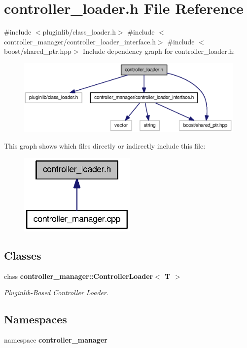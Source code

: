 \section{controller\-\_\-loader.\-h \-File \-Reference}
\label{controller__loader_8h}
{\ttfamily \#include $<$pluginlib/class\-\_\-loader.\-h$>$}\*
{\ttfamily \#include $<$controller\-\_\-manager/controller\-\_\-loader\-\_\-interface.\-h$>$}\*
{\ttfamily \#include $<$boost/shared\-\_\-ptr.\-hpp$>$}\*
\-Include dependency graph for controller\-\_\-loader.\-h\-:\nopagebreak
\begin{figure}[H]
\begin{center}
\leavevmode
\includegraphics[width=350pt]{controller__loader_8h__incl}
\end{center}
\end{figure}
\-This graph shows which files directly or indirectly include this file\-:\nopagebreak
\begin{figure}[H]
\begin{center}
\leavevmode
\includegraphics[width=162pt]{controller__loader_8h__dep__incl}
\end{center}
\end{figure}
\subsection*{\-Classes}
\begin{DoxyCompactItemize}
\item 
class {\bf controller\-\_\-manager\-::\-Controller\-Loader$<$ T $>$}
\begin{DoxyCompactList}\small\item\em \-Pluginlib-\/\-Based \-Controller \-Loader. \end{DoxyCompactList}\end{DoxyCompactItemize}
\subsection*{\-Namespaces}
\begin{DoxyCompactItemize}
\item 
namespace {\bf controller\-\_\-manager}
\end{DoxyCompactItemize}
